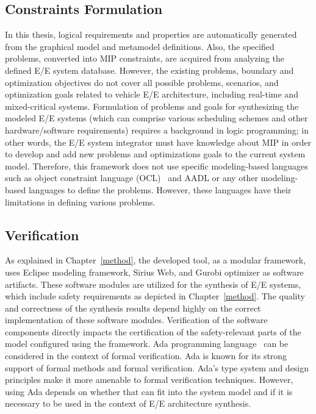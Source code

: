     \subsection{Constraints Formulation}
    In this thesis, logical requirements and properties are automatically generated from the graphical model and metamodel definitions. Also, the specified problems, converted into MIP constraints, are acquired from analyzing the defined E/E system database. However, the existing problems, boundary and optimization objectives do not cover all possible problems, scenarios, and optimization goals related to vehicle E/E architecture, including real-time and mixed-critical systems.
    Formulation of problems and goals for synthesizing the modeled E/E systems (which can comprise various scheduling schemes and other hardware/software requirements) requires
    a background in logic programming; in other words, the E/E system integrator must have knowledge about MIP in order to develop and add new problems and optimizations goals to the current system model. Therefore, this framework does not use specific modeling-based languages such as object constraint language (OCL)~\cite{warmer2003object} and AADL or any other modeling-based languages to define the problems. However, these languages have their limitations in defining various problems. 
    
    
    \subsection{Verification}
    
    
    As explained in Chapter~\ref{method}, the developed tool, as a modular framework, uses Eclipse modeling framework, Sirius Web, and Gurobi optimizer as software artifacts.
    These software modules are utilized for the synthesis of E/E systems, which include safety requirements as depicted in Chapter~\ref{method}.
    The quality and correctness of the synthesis results depend highly on the correct implementation of
    these software modules. Verification of the software components directly impacts
    the certification of the safety-relevant parts of the model configured using the
    framework. Ada programming language~\cite{barnes1984programming} can be considered in the context of formal verification. Ada is known for its strong support of formal methods and formal verification. Ada's type system and design principles make it more amenable to formal verification techniques. However, using Ada depends on whether that can fit into the system model and if it is necessary to be used in the context of E/E architecture synthesis.  

